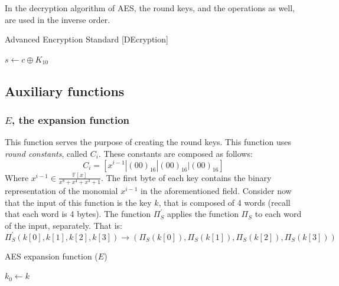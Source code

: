 In the decryption algorithm of AES, the round keys, and the operations as well, are used in the inverse order.
\begin{algorithm}
\caption{Advanced Encryption Standard [DEcryption]}\label{alg:AES_decrypt}
$s \gets c \oplus K_{10}$\;
\end{algorithm}

\subsection{Auxiliary functions}
\subsubsection{$E$, the expansion function}
This function serves the purpose of creating the round keys.\newline
This function uses \emph{round constants}, called $C_{i}$. These constants are composed as follows:
\[
C_{i} = [x^{i-1} | (00)_{16}| (00)_{16}| (00)_{16}]
\]
Where $x^{i-1} \in \frac{\mathbb{F}[x]}{x^{8} + x^{4} + x^{3} + 1}$. The first byte of each key contains the binary representation of the monomial $x^{i-1}$ in the aforementioned field.\newline
Consider now that the input of this function is the key $k$, that is composed of 4 words (recall that each word is 4 bytes). The function $\Pi_{S}^{'}$ applies the function $\Pi_{S}$ to each word of the input, separately. That is:
\[
\Pi_{S}^{'}(k[0],k[1],k[2],k[3]) \rightarrow (\Pi_{S}(k[0]),\Pi_{S}(k[1]),\Pi_{S}(k[2]),\Pi_{S}(k[3]))
\]
\begin{algorithm}
\caption{AES expansion function ($E$)}\label{alg:AES_expansion}
$k_{0} \gets k$\;
\end{algorithm}

